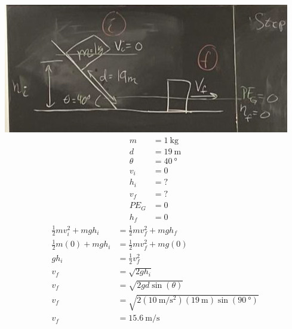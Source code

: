 \documentclass{article}
\begin{document}
\includegraphics[width = \linewidth]{image.png}
\begin{align*}
	m & = \SI{1}{\kilogram} \\
	d & = \SI{19}{\meter} \\
	\theta & = \SI{40}{\degree} \\
	v_i & = 0 \\
	h_i & = ? \\
	v_f & = ? \\
	PE_G & = 0 \\
	h_f & = 0
\end{align*}
\begin{align*}
	\frac{1}{2}mv_i^2 + mgh_i & = \frac{1}{2}mv_f^2 + mgh_f \\
	\frac{1}{2}m(0) + mgh_i & = \frac{1}{2}mv_f^2 + mg(0) \\
	gh_i & = \frac{1}{2}v_f^2 \\
	v_f & = \sqrt{2gh_i} \\
	v_f & = \sqrt{2gd\sin(\theta)} \\
	v_f & = \sqrt{2(\SI{10}{\meter \per \second \squared})(\SI{19}{\meter})\sin(\SI{90}{\degree})} \\
	v_f & = \SI{15.6}{\meter \per \second}
\end{align*}
\end{document}
